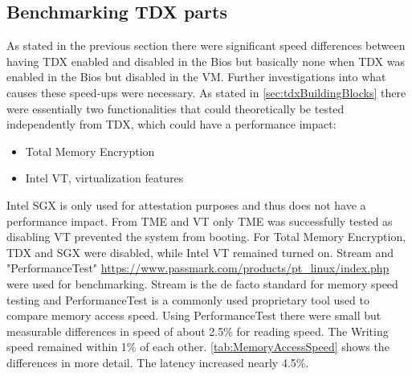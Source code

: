 \subsection{Benchmarking TDX parts}

As stated in the previous section there were significant speed differences between having TDX enabled and disabled in the Bios but basically none when TDX was enabled in the Bios but disabled in the VM. Further investigations into what causes these speed-ups were necessary. As stated in \ref{sec:tdxBuildingBlocks} there were essentially two functionalities that could theoretically be tested independently from TDX, which could have a performance impact:
\begin{itemize}
    \item Total Memory Encryption 
    \item Intel VT, virtualization features
\end{itemize}
Intel SGX is only used for attestation purposes and thus does not have a performance impact. From TME and VT only TME was successfully tested as disabling VT prevented the system from booting.
For Total Memory Encryption, TDX and SGX were disabled, while Intel VT remained turned on. Stream \cite{mccalpin_memory_1995} and "PerformanceTest" \url{https://www.passmark.com/products/pt_linux/index.php} were used for benchmarking. Stream is the de facto standard for memory speed testing and PerformanceTest is a commonly used proprietary tool used to compare memory access speed. Using PerformanceTest there were small but measurable differences in speed of about 2.5\% for reading speed. The Writing speed remained within 1\% of each other. \cref{tab:MemoryAccessSpeed} shows the differences in more detail. The latency increased nearly 4.5\%.
\begin{table}
\centering
{}
\caption{Results of Performancetests memory benchmark}
\label{tab:MemoryAccessSpeed}
\end{table}

